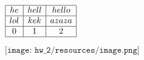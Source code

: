 \documentclass[12pt]{article}
\begin{document}
$
\begin{array}{|c|c|c|}
\hline
he & hell & hello\\
\hline
lol & kek & azaza\\
\hline
0 & 1 & 2\\
\hline
\end{array}
$

$\texttt{[image: hw\_2/resources/image.png]}$
\end{document}
